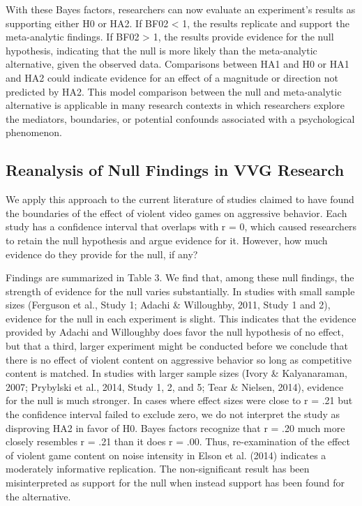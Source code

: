 \documentclass{article}
\begin{document}
With these Bayes factors, researchers can now evaluate an experiment’s results as supporting either H0 or HA2. If BF02 < 1, the results replicate and support the meta-analytic findings. If BF02 > 1, the results provide evidence for the null hypothesis, indicating that the null is more likely than the meta-analytic alternative, given the observed data.  Comparisons between HA1 and H0 or HA1 and HA2 could indicate evidence for an effect of a magnitude or direction not predicted by HA2. This model comparison between the null and meta-analytic alternative is applicable in many research contexts in which researchers explore the mediators, boundaries, or potential confounds associated with a psychological phenomenon.

\subsection{Reanalysis of Null Findings in VVG Research}
We apply this approach to the current literature of studies claimed to have found the boundaries of the effect of violent video games on aggressive behavior. Each study has a confidence interval that overlaps with r = 0, which caused researchers to retain the null hypothesis and argue evidence for it. However, how much evidence do they provide for the null, if any?

Findings are summarized in Table 3. We find that, among these null findings, the strength of evidence for the null varies substantially. In studies with small sample sizes (Ferguson et al., Study 1; Adachi \& Willoughby, 2011, Study 1 and 2), evidence for the null in each experiment is slight. This indicates that the evidence provided by Adachi and Willoughby does favor the null hypothesis of no effect, but that a third, larger experiment might be conducted before we conclude that there is no effect of violent content on aggressive behavior so long as competitive content is matched. In studies with larger sample sizes (Ivory \& Kalyanaraman, 2007; Prybylski et al., 2014, Study 1, 2, and 5; Tear \& Nielsen, 2014), evidence for the null is much stronger.	In cases where effect sizes were close to r = .21 but the confidence interval failed to exclude zero, we do not interpret the study as disproving HA2 in favor of H0. Bayes factors recognize that r = .20 much more closely resembles r = .21 than it does r = .00. Thus, re-examination of the effect of violent game content on noise intensity in Elson et al. (2014) indicates a moderately informative replication. The non-significant result has been misinterpreted as support for the null when instead support has been found for the alternative.
\end{document}
